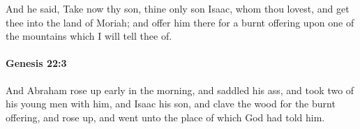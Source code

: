 			And he said, Take now thy son, thine only son Isaac, whom thou lovest, and get thee into the land of Moriah; and offer him there for a burnt offering upon one of the mountains which I will tell thee of.

			\begin{framed}
			\scriptsize
				\begin{compactdesc}
					\item[LXX] 
				\end{compactdesc}
			\end{framed}

		\paragraph{Genesis 22:3} %
			\label{GENESIS-22-3}

			And Abraham rose up early in the morning, and saddled his ass, and took two of his young men with him, and Isaac his son, and clave the wood for the burnt offering, and rose up, and went unto the place of which God had told him.


